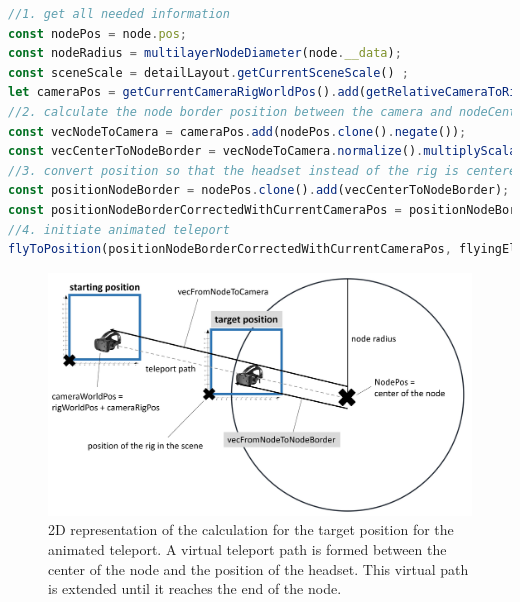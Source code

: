 \begin{lstlisting}[language=JavaScript,label={lst:calculationFlyToNode},caption=Matrix calculations for determining the target position of the animated teleport.]
//1. get all needed information
const nodePos = node.pos;
const nodeRadius = multilayerNodeDiameter(node.__data);
const sceneScale = detailLayout.getCurrentSceneScale() ;
let cameraPos = getCurrentCameraRigWorldPos().add(getRelativeCameraToRigPos());
//2. calculate the node border position between the camera and nodeCenter
const vecNodeToCamera = cameraPos.add(nodePos.clone().negate());
const vecCenterToNodeBorder = vecNodeToCamera.normalize().multiplyScalar(nodeRadius*0.95*sceneScale);//*0.95 as we want to be slightly inside the selected node
//3. convert position so that the headset instead of the rig is centered
const positionNodeBorder = nodePos.clone().add(vecCenterToNodeBorder);
const positionNodeBorderCorrectedWithCurrentCameraPos = positionNodeBorder.clone().add(getRelativeCameraToRigPos().negate());
//4. initiate animated teleport
flyToPosition(positionNodeBorderCorrectedWithCurrentCameraPos, flyingElement);
\end{lstlisting}
\pagebreak

\begin{figure}[h]
    \centering
    \includegraphics[width=1\textwidth]{graphics/flyToNodePositionCalc.jpg}
    \caption[2D representation of the calculation for the target position for the animated teleport.]{2D representation of the calculation for the target position for the animated teleport. A virtual teleport path is formed between the center of the node and the position of the headset. This virtual path is extended until it reaches the end of the node.} 
    \label{fig:vrFlyToNode} 
\end{figure}

